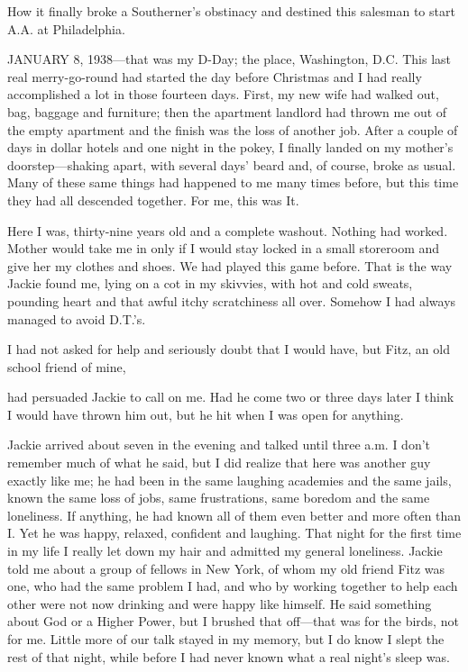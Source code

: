

\bbChapterPreamble




\begin{biblechapter}
    How it finally broke a Southerner’s obstinacy 
    and destined this salesman to start A.A. at Philadelphia.
\end{biblechapter}


\begin{biblechapter}
    JANUARY 8, 1938—that was my D-Day; 
    the place, Washington, D.C.
\verse This last real merry-go-round 
    had started the day before Christmas 
    and I had really accomplished a lot in those fourteen days.
\verse First, my new wife had walked out, 
    bag, baggage and furniture; 
    then the apartment landlord 
    had thrown me out of the empty apartment 
    and the finish was the loss of another job.
\verse After a couple of days in dollar hotels and one night in the pokey, 
    I finally landed on my mother’s doorstep—shaking apart, 
    with several days’ beard and, 
    of course, broke as usual.
\verse Many of these same things had happened to me many times before, 
    but this time they had all descended together.
\verse For me, this was It.

\verse Here I was, thirty-nine years old and a complete washout.
\verse Nothing had worked.
\verse Mother would take me in only if I would stay locked 
    in a small storeroom and give her my clothes and shoes.
\verse We had played this game before.
\verse That is the way Jackie found me, 
    lying on a cot in my skivvies, 
    with hot and cold sweats, 
    pounding heart and that awful itchy scratchiness all over.
\verse Somehow I had always managed to avoid D.T.’s.

I had not asked for help and seriously doubt that I would have, but Fitz, an old school friend of mine,

had persuaded Jackie to call on me. Had he come two or three days later I think I would have thrown him out, but he hit when I was open for anything.

Jackie arrived about seven in the evening and talked until three a.m. I don’t remember much of what he said, but I did realize that here was another guy exactly like me; he had been in the same laughing academies and the same jails, known the same loss of jobs, same frustrations, same boredom and the same loneliness. If anything, he had known all of them even better and more often than I. Yet he was happy, relaxed, confident and laughing. That night for the first time in my life I really let down my hair and admitted my general loneliness. Jackie told me about a group of fellows in New York, of whom my old friend Fitz was one, who had the same problem I had, and who by working together to help each other were not now drinking and were happy like himself. He said something about God or a Higher Power, but I brushed that off—that was for the birds, not for me. Little more of our talk stayed in my memory, but I do know I slept the rest of that night, while before I had never known what a real night’s sleep was.


\end{biblechapter}
